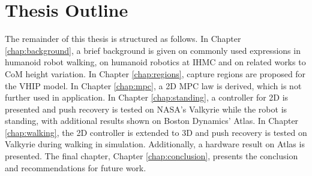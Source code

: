 \section{Thesis Outline}
The remainder of this thesis is structured as follows. In Chapter \ref{chap:background}, a brief background is given on commonly used expressions in humanoid robot walking, on humanoid robotics at \ac{IHMC} and on related works to \ac{CoM} height variation. In Chapter \ref{chap:regions}, capture regions are proposed for the \ac{VHIP} model. In Chapter \ref{chap:mpc}, a \ac{2D} \ac{MPC} law is derived, which is not further used in application. In Chapter \ref{chap:standing}, a controller for \ac{2D} is presented and push recovery is tested on NASA's Valkyrie while the robot is standing, with additional results shown on Boston Dynamics' Atlas. In Chapter \ref{chap:walking}, the \ac{2D} controller is extended to \ac{3D} and push recovery is tested on Valkyrie during walking in simulation. Additionally, a hardware result on Atlas is presented. The final chapter, Chapter \ref{chap:conclusion}, presents the conclusion and recommendations for future work.

